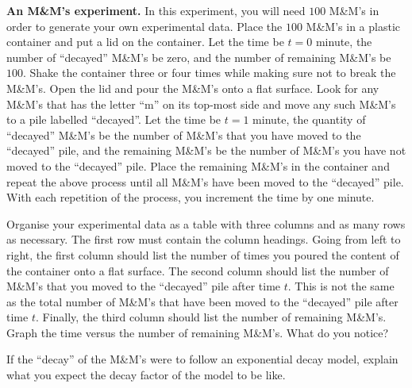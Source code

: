 \documentclass[a4paper,oneside,12pt]{article}
\begin{document}
\begin{exercise}
\label{ex:exponential:MnM_experiment}
\textbf{An M\&M's experiment.}
In this experiment, you will need $100$ M\&M's in order to generate
your own experimental data.  Place the $100$ M\&M's in a plastic
container and put a lid on the container.  Let the time be $t = 0$
minute, the number of ``decayed'' M\&M's be zero, and the number of
remaining M\&M's be $100$.  Shake the container three or four times
while making sure not to break the M\&M's.  Open the lid and pour the
M\&M's onto a flat surface.  Look for any M\&M's that has the letter
``m'' on its top-most side and move any such M\&M's to a pile labelled
``decayed''.  Let the time be $t = 1$ minute, the quantity of
``decayed'' M\&M's be the number of M\&M's that you have moved to the
``decayed'' pile, and the remaining M\&M's be the number of M\&M's you
have not moved to the ``decayed'' pile.  Place the remaining M\&M's in
the container and repeat the above process until all M\&M's have been
moved to the ``decayed'' pile.  With each repetition of the process,
you increment the time by one minute.
\begin{packedenum}
\item\label{subex:exponential:MnM_data}
  Organise your experimental data as a table with three columns and as
  many rows as necessary.  The first row must contain the column
  headings.  Going from left to right, the first column should list
  the number of times you poured the content of the container onto a
  flat surface.  The second column should list the number of M\&M's
  that you moved to the ``decayed'' pile after time $t$.  This is not
  the same as the total number of M\&M's that have been moved to the
  ``decayed'' pile after time $t$.  Finally, the third column should
  list the number of remaining M\&M's.  Graph the time versus the
  number of remaining M\&M's.  What do you notice?

\item\label{subex:exponential:MnM_decay_factor}
  If the ``decay'' of the M\&M's were to follow an exponential decay
  model, explain what you expect the decay factor of the model to be
  like.


\end{packedenum}
\end{exercise}
\end{document}
